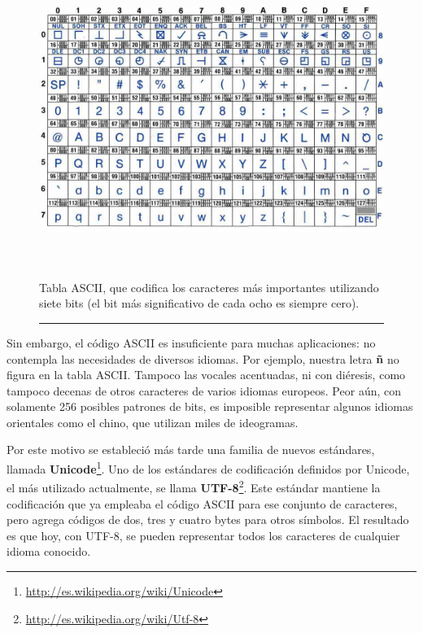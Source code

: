\documentclass[a4paper]{article}
\begin{document}
 \begin{figure}
 \begin{minipage}{17cm}
 \begin{center}
 \includegraphics[width=13.335cm,height=9.423cm] {IC2020Codificacion20de20datos-img1.jpg}
 {\itshape  \par  Tabla ASCII, que codifica los caracteres más importantes utilizando siete bits \newline (el bit más significativo de cada ocho   es siempre cero).\par}
\rule{\textwidth}{0.005in}
 \end{center}
 \end{minipage}
 \end{figure}
Sin embargo, el código ASCII es insuficiente para muchas aplicaciones:
no contempla las necesidades de diversos idiomas. Por ejemplo, nuestra
letra \textbf{ñ} no figura en la tabla ASCII. Tampoco las vocales
acentuadas, ni con diéresis, como tampoco decenas de otros caracteres
de varios idiomas europeos. Peor aún, con solamente 256 posibles
patrones de bits, es imposible representar algunos idiomas orientales
como el chino, que utilizan miles de ideogramas.

Por este motivo se estableció más tarde una familia de nuevos
estándares, llamada
\textbf{Unicode}\footnote{\url{http://es.wikipedia.org/wiki/Unicode}}.
Uno de los estándares de codificación definidos por Unicode, el
más utilizado actualmente, se llama
\textbf{UTF-8}\footnote{\url{http://es.wikipedia.org/wiki/Utf-8}}. Este
estándar mantiene la codificación que ya empleaba el código ASCII
para ese conjunto de caracteres, pero agrega códigos de dos, tres y
cuatro bytes para otros símbolos. El resultado es que hoy, con UTF-8,
se pueden representar todos los caracteres de cualquier idioma
conocido.
\end{document}

